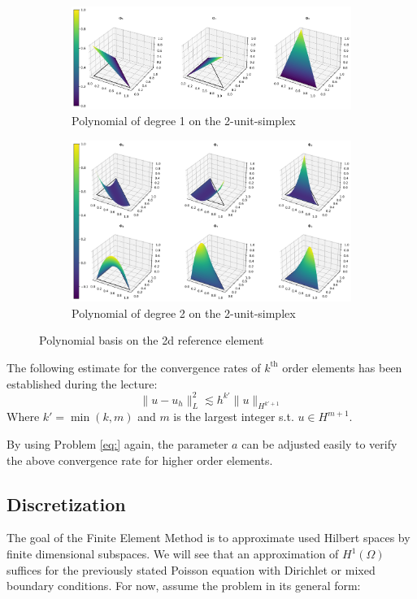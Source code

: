 \documentclass[11pt,a4paper]{article}
\begin{document}
\begin{figure}
  \centering
  \begin{subfigure}{1.\textwidth}
    \centering
    \includegraphics[width=.8\linewidth]{p1_2d_mesh_basis}
    \caption{Polynomial of degree 1 on the 2-unit-simplex}
  \end{subfigure}
  \begin{subfigure}{1.\textwidth}
    \centering
    \includegraphics[width=.8\linewidth]{p2_2d_mesh_basis}
    \caption{Polynomial of degree 2 on the 2-unit-simplex}
  \end{subfigure}
  \caption{Polynomial basis on the 2d reference element}
  \label{fig:basis_2d}
\end{figure}


The following estimate for the convergence rates of $k^{\text{th}}$ order
elements has been established during the lecture:
\begin{equation}
  \lVert u - u_h \rVert_L^2 \lesssim h^{k'} \lVert u \rVert_{H^{k'+1}}
\end{equation}
Where $k' = \operatorname{min}\left(k,m\right)$ and $m$ is the largest integer s.t. $u \in H^{m+1}$.

By using Problem \ref{eq:} again, the parameter $a$ can be adjusted easily to
verify the above convergence rate for higher order elements.







\subsection*{Discretization}
The goal of the Finite Element Method is to approximate used Hilbert spaces by
finite dimensional subspaces. We will see that an approximation of $H^1(\Omega)$
suffices for the previously stated Poisson equation with Dirichlet or mixed
boundary conditions. For now, assume the problem in its general form:\\
\end{document}
